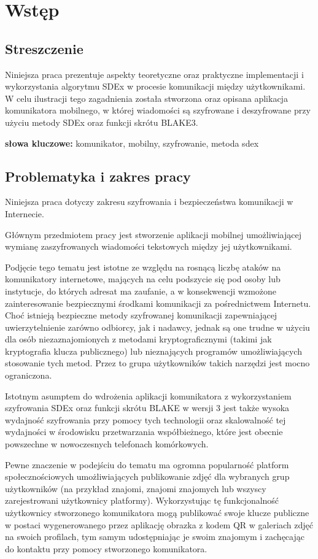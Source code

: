 \documentclass[../main.tex]{subfiles}
\begin{document}
\chapter{Wstęp}

\section{Streszczenie}

Niniejsza praca prezentuje aspekty teoretyczne oraz praktyczne implementacji i wykorzystania algorytmu SDEx w procesie komunikacji między użytkownikami. W celu ilustracji tego zagadnienia została stworzona oraz opisana aplikacja komunikatora mobilnego, w której wiadomości są szyfrowane i deszyfrowane przy użyciu metody SDEx oraz funkcji skrótu BLAKE3.

\textbf{słowa kluczowe:} komunikator, mobilny, szyfrowanie, metoda sdex

\section{Problematyka i zakres pracy}
Niniejsza praca dotyczy zakresu szyfrowania i bezpieczeństwa komunikacji w Internecie.

Głównym przedmiotem pracy jest stworzenie aplikacji mobilnej umożliwiającej wymianę zaszyfrowanych wiadomości tekstowych między jej użytkownikami.

Podjęcie tego tematu jest istotne ze względu na rosnącą liczbę ataków na komunikatory internetowe, mających na celu podszycie się pod osoby lub instytucje, do których adresat ma zaufanie, a w konsekwencji wzmożone zainteresowanie bezpiecznymi środkami komunikacji za pośrednictwem Internetu. Choć istnieją bezpieczne metody szyfrowanej komunikacji zapewniającej uwierzytelnienie zarówno odbiorcy, jak i nadawcy, jednak są one trudne w użyciu dla osób niezaznajomionych z metodami kryptograficznymi (takimi jak kryptografia klucza publicznego) lub nieznających programów umożliwiających stosowanie tych metod. Przez to grupa użytkowników takich narzędzi jest mocno ograniczona.

Istotnym asumptem do wdrożenia aplikacji komunikatora z wykorzystaniem szyfrowania SDEx oraz funkcji skrótu BLAKE w wersji 3 jest także wysoka wydajność szyfrowania przy pomocy tych technologii oraz skalowalność tej wydajności w środowisku przetwarzania współbieżnego, które jest obecnie powszechne w nowoczesnych telefonach komórkowych.

Pewne znaczenie w podejściu do tematu ma ogromna popularność platform społecznościowych umożliwiających publikowanie zdjęć dla wybranych grup użytkowników (na przykład znajomi, znajomi znajomych lub wszyscy zarejestrowani użytkownicy platformy). Wykorzystując tę funkcjonalność użytkownicy stworzonego komunikatora mogą publikować swoje klucze publiczne w postaci wygenerowanego przez aplikację obrazka z kodem QR w galeriach zdjęć na swoich profilach, tym samym udostępniając je swoim znajomym i zachęcając do kontaktu przy pomocy stworzonego komunikatora.
\end{document}
